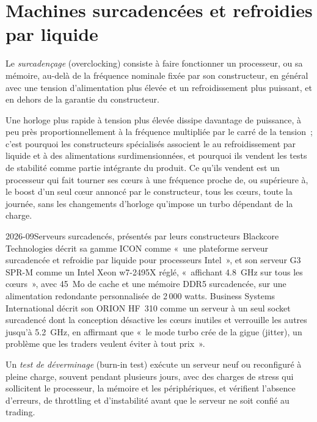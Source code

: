 \section{Machines surcadencées et refroidies par liquide}

\begin{definition}\label{def:nw:servers:oc}
Le \emph{surcadençage} (overclocking) consiste à faire fonctionner un processeur, ou sa mémoire, au-delà de la fréquence nominale fixée par son constructeur, en général avec une tension
d'alimentation plus élevée et un refroidissement plus puissant, et en dehors de la garantie du constructeur.
\end{definition}

Une horloge plus rapide à tension plus élevée dissipe davantage de puissance, à peu près proportionnellement à la fréquence multipliée par le carré de la tension~; c'est pourquoi les
constructeurs spécialisés associent le  au refroidissement par liquide et à des alimentations surdimensionnées, et pourquoi ils vendent les tests de stabilité comme partie intégrante du
produit. Ce qu'ils vendent est un processeur qui fait tourner ses cœurs à une fréquence proche de, ou supérieure à, le boost d'un seul cœur annoncé par le constructeur, tous
les cœurs, toute la journée, sans les changements d'horloge qu'impose un turbo dépendant de la charge.

\begin{dated}{2026-09}{Serveurs surcadencés, présentés par leurs constructeurs}\label{dat:nw:servers:oc}
Blackcore Technologies décrit sa gamme ICON comme «~une plateforme serveur surcadencée et refroidie par liquide pour processeurs Intel~», et son serveur G3 SPR-M
comme un Intel Xeon w7-2495X réglé, «~affichant 4.8~GHz sur tous les cœurs~», avec 45~Mo de cache et une mémoire DDR5 surcadencée, sur
une alimentation redondante personnalisée de 2\,000 watts. Business Systems International décrit son ORION HF~310 comme un serveur à un seul socket surcadencé
dont la conception désactive les cœurs inutiles et verrouille les autres jusqu'à 5.2~GHz, en affirmant que «~le mode turbo crée de la gigue (jitter), un problème que
les traders veulent éviter à tout prix~».
\end{dated}

\begin{definition}\label{def:nw:servers:burnin}
Un \emph{test de déverminage} (burn-in test) exécute un serveur neuf ou reconfiguré à pleine charge, souvent pendant plusieurs jours, avec des charges de stress qui
sollicitent le processeur, la mémoire et les périphériques, et vérifient l'absence d'erreurs, de throttling et d'instabilité avant que le serveur
ne soit confié au trading.
\end{definition}

